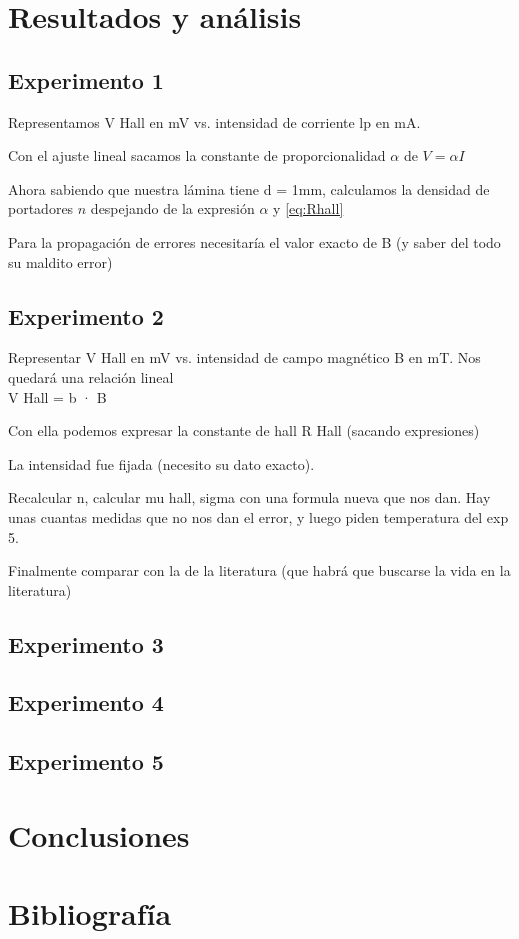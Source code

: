 

\section{Resultados y análisis}

\subsection{Experimento 1}

Representamos V Hall en mV vs. intensidad de corriente lp en mA.

Con el ajuste lineal sacamos la constante de proporcionalidad $\alpha$ de $V = \alpha I$

Ahora sabiendo que nuestra lámina tiene d = 1mm, calculamos la densidad de portadores $n$ despejando de la expresión $\alpha $ y \eqref{eq:Rhall}

Para la propagación de errores necesitaría el valor exacto de B (y saber del todo su maldito error)


\subsection{Experimento 2}

Representar V Hall en mV vs. intensidad de campo magnético B en mT.
Nos quedará una relación lineal\\
V Hall = b · B

Con ella podemos expresar la constante de hall R Hall (sacando expresiones)

La intensidad fue fijada (necesito su dato exacto). 

Recalcular n, calcular mu hall, sigma con una formula nueva que nos dan. Hay unas cuantas medidas que no nos dan el error, y luego piden temperatura del exp 5. 

Finalmente comparar con la de la literatura (que habrá que buscarse la vida en la literatura)


\subsection{Experimento 3}



\subsection{Experimento 4}



\subsection{Experimento 5}




\section{Conclusiones}


\section{Bibliografía}






